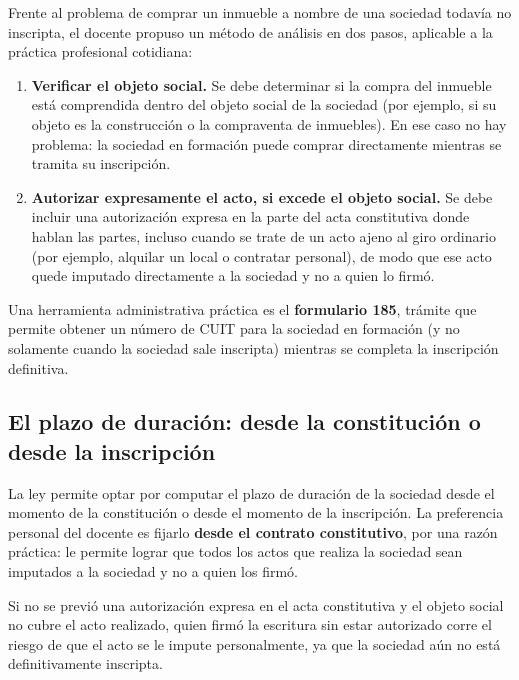 \documentclass[12pt,oneside]{book}
\begin{document}
Frente al problema de comprar un inmueble a nombre de una sociedad todavía no inscripta, el docente propuso un método de análisis en dos pasos, aplicable a la práctica profesional cotidiana:

\begin{enumerate}
    \item \textbf{Verificar el objeto social.} Se debe determinar si la compra del inmueble está comprendida dentro del objeto social de la sociedad (por ejemplo, si su objeto es la construcción o la compraventa de inmuebles). En ese caso no hay problema: la sociedad en formación puede comprar directamente mientras se tramita su inscripción.
    \item \textbf{Autorizar expresamente el acto, si excede el objeto social.} Se debe incluir una autorización expresa en la parte del acta constitutiva donde hablan las partes, incluso cuando se trate de un acto ajeno al giro ordinario (por ejemplo, alquilar un local o contratar personal), de modo que ese acto quede imputado directamente a la sociedad y no a quien lo firmó.
\end{enumerate}

Una herramienta administrativa práctica es el \textbf{formulario 185}, trámite que permite obtener un número de CUIT para la sociedad en formación (y no solamente cuando la sociedad sale inscripta) mientras se completa la inscripción definitiva.

\subsection{El plazo de duración: desde la constitución o desde la inscripción}

La ley permite optar por computar el plazo de duración de la sociedad desde el momento de la constitución o desde el momento de la inscripción. La preferencia personal del docente es fijarlo \textbf{desde el contrato constitutivo}, por una razón práctica: le permite lograr que todos los actos que realiza la sociedad sean imputados a la sociedad y no a quien los firmó.

\begin{important}
Si no se previó una autorización expresa en el acta constitutiva y el objeto social no cubre el acto realizado, quien firmó la escritura sin estar autorizado corre el riesgo de que el acto se le impute personalmente, ya que la sociedad aún no está definitivamente inscripta.
\end{important}
\end{document}
